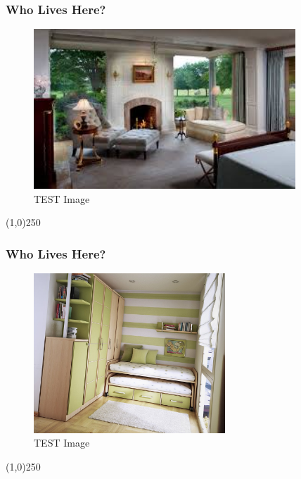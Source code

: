 \begin{frame}
\frametitle{Who Lives Here?}
\begin{figure}
	\centering
		\includegraphics[height=6cm]{img/F.jpg}
	\caption{TEST Image}
	\label{fig:lightingtypes}
\end{figure}
\end{frame}
\begin{center}\line(1,0){250}\end{center}




\begin{frame}
\frametitle{Who Lives Here?}
\begin{figure}
	\centering
		\includegraphics[height=6cm]{img/G.jpg}
	\caption{TEST Image}
	\label{fig:lightingtypes}
\end{figure}
\end{frame}
\begin{center}\line(1,0){250}\end{center}




